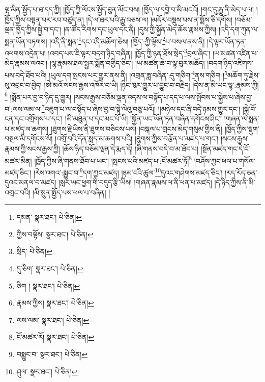 ལྷ་མིན་སྤྱོད་པ་ཐ་དད་ཀྱི། །ཁྱོད་ཀྱི་ལོངས་སྤྱོད་ཐུན་མོང་བས། །ཁྱོད་ལ་དབྱེ་བ་མི་མངའོ། །གང་དུ་རྒྱུ་ནི་མེད་པ་ལ། །ཁྱོད་ཀྱིས་བསྟན་པར་རབ་བཙུད་ན། །དེ་ལ་ཐར་པའི་རྒྱུ་བཅས་ལ། །མདོར་བསྡུས་པས་ན་སྨོས་ཅི་དགོས། །བཅོམ་ལྡན་ཁྱོད་ཀྱིས་སྐྱེ་བ་དང་། །ན་ཚོད་རིགས་དང་ཡུལ་དང་ནི། །དུས་ཀྱི་སྐྱོན་མེད་ཆོས་རྣམས་ཀྱིས། །འདི་དག་ཀུན་ལ་སྨན་ཡོན་བཏགས། །འདི་ནི་སྨན་\footnote{དམན་  སྣར་ཐང་།  པེ་ཅིན། }དང་འདི་མཆོག་ཅེས། །ཁྱོད་:ཀྱི་ལྟོས་\footnote{ཀྱིས་བལྟོས་  སྣར་ཐང་།  པེ་ཅིན། }པ་བསལ་ནས་ནི། །དེ་ལྟར་ཡོན་ཏན་འཕགས་འདྲེན་པ། །འབད་པས་ཇི་ལྟར་བདག་ཉིད་བཞིན། །ཁྱོད་ཀྱི་ཉན་ཐོས་སྲེད་\footnote{སྲིད་  པེ་ཅིན། }བྲལ་ཞིང་། །ཡ་མཚན་འཛིན་པ་མེད་རྣམས་ལའང་། །ལྷ་རྣམས་ཐལ་སྦྱར་སྨོན་བགྱིད་ཅིང་། །ཡ་མཚན་ཆེ་བ་ལྟ་བུར་མཆོད། །བདག་ཉིད་འཇིགས་པས་བདེ་ཐོབ་པའི། །ཡུལ་དག་སྤངས་པར་གྱུར་ནས་ནི། །འགྲན་ཟླ་བཞིན་:དུ་གཅིག་\footnote{དུ་ཅིག་  སྣར་ཐང་།  པེ་ཅིན། }ནས་གཅིག །\footnote{ཅིག །  སྣར་ཐང་།  པེ་ཅིན། }མཆོག་ཏུ་རྗེས་སུ་འབྲང་བ་བྱེད། །ཨེ་མའོ་སངས་རྒྱས་འཁོར་བ་ཡི། །ཉིང་ཁུར་གྱུར་པ་བྱུང་བ་བརྗིད། །དེས་ན་མི་ཡང་ལྷ་:རྣམས་ཀྱི།\footnote{རྣམས་ཀྱིས།  སྣར་ཐང་།  པེ་ཅིན། } །སྨོན་པར་བྱ་བ་ཉིད་དུ་གྱུར། །སངས་རྒྱས་བཅོམ་ལྡན་འདས་ལ་བསྟོད་པ་དད་པ་ལས་སྤོབས་པ་སྐྱེས་པ་ཞེས་བྱ་བ་:ལས་ལམ་ལ་\footnote{ལས་ལམ་  སྣར་ཐང་།  པེ་ཅིན། }འཇུག་པ་ལ་བསྟོད་པ་ཞེས་བྱ་བ་སྟེ་ལེའུ་བཅུ་པའོ།། །།མཉེལ་དང་ཞི་བདེ་ཉམས་གྱུར་དང་། །སྐྱེ་བོ་ངན་དང་འགྲོགས་པ་དང་། །མི་མཐུན་པ་དང་མང་པོ་ཡི། །སྐྱོན་ཡང་ཡོན་ཏན་བཞིན་དགོངས་ཤིང་། །གཞན་ལ་སྨན་པ་མཛད་ལ་ཆགས། །ཐུགས་རྗེ་ཡིས་ནི་ཐུགས་བཅིངས་པས། །བསྐལ་པ་གྲངས་མེད་གསུམ་གྱིས་ནི། །ཁྱོད་ཀྱིས་སྡུག་བསྔལ་མི་དགོངས་སོ། །འགྲོ་བའི་དོན་སླད་མ་ཆགས་པའི། །ཐུགས་ཀྱིས་བརྩོན་པ་མཛད་པ་གང་། །སངས་རྒྱས་རྣམས་ཀྱི་སངས་རྒྱས་ཀྱི། །ཆོས་ཉིད་བཅོམ་ལྡན་དེ་རྨད་དོ། །ཞི་གནས་བདེ་བ་མ་ཐོབ་པ། །སྔོན་མཛད་གང་དེ་ངོ་མཚར་མིན། །ཁྱོད་ཀྱིས་ཞི་གནས་ཐོབ་པ་ཡང་། །སྤངས་པའི་མཛད་པ་:ངོ་མཚར་ཏོ།\footnote{ངོ་མཚར་རོ།  སྣར་ཐང་།  པེ་ཅིན། } །བཤོས་ཀྱང་ཕལ་པ་གསོལ་མཛད་ཅིང་། །རེས་འགའ་:སྨྱུང་བ་\footnote{བསྨྱུང་བ་  སྣར་ཐང་།  པེ་ཅིན། }དག་ཀྱང་མཛད། །ཉམ་ངའི་ཚུལ་\footnote{ཤུལ་  སྣར་ཐང་།  པེ་ཅིན། }དུའང་གཤེགས་མཛད་ཅིང་། །རད་རོད་ཅན་དུའང་མནལ་བ་མཛད། །སླར་ཡང་ཕྱག་གི་བདུད་རྩི་ཡིས། །གཞན་རྣམས་ལ་ནི་ཕན་པ་མཛད། །དེ་ཉིད་ཀྱིས་ནི་མི་འགྲང་བའི། །མི་སྲུན་སྤྱོད་པས་ཕལ་པ་བཞིན། །
